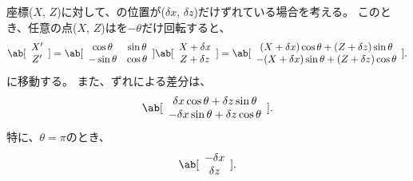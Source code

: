 




\TableCenter 座標($X$, $Z$)に対して、\JigCenter の位置が($\delta x$, $\delta z$)だけずれている場合を考える。
このとき、任意の点($X$, $Z$)は\Table を$-\theta$だけ回転すると、
\begin{align*}
  \ab[
    \begin{array}{c}
      X'\\
      Z'
    \end{array}
  ]
  = \ab[
    \begin{array}{cc}
      \cos\theta & \sin\theta\\
      -\sin\theta & \cos\theta
    \end{array}
  ]
  \ab[
    \begin{array}{c}
      X+\delta x\\
      Z+\delta z
    \end{array}
  ]
  = \ab[
    \begin{array}{c}
      (X+\delta x)\cos\theta+(Z+\delta z)\sin\theta\\
      -(X+\delta x)\sin\theta+(Z+\delta z)\cos\theta
    \end{array}
  ].
\end{align*}
に移動する。
また、ずれによる差分は、
\begin{align*}
  \ab[
    \begin{array}{c}
      \delta x\cos\theta+\delta z\sin\theta\\
      -\delta x\sin\theta+\delta z\cos\theta
    \end{array}
  ].
\end{align*}
特に、$\theta = \pi$のとき、
\begin{align*}
  \ab[
    \begin{array}{c}
      -\delta x\\
      \delta z
    \end{array}
  ].
\end{align*}


